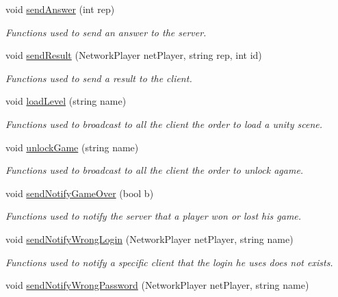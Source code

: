 \begin{DoxyCompactItemize}
void \hyperlink{class_c3_p_o_network_manager_a63c323fb07667c3216f0aa11d4672b25}{send\-Answer} (int rep)
\begin{DoxyCompactList}\small\item\em Functions used to send an answer to the server.\end{DoxyCompactList}\item 
void \hyperlink{class_c3_p_o_network_manager_af5500ddb7ecaba2c27c1cca8c2ff1f20}{send\-Result} (Network\-Player net\-Player, string rep, int id)
\begin{DoxyCompactList}\small\item\em Functions used to send a result to the client.\end{DoxyCompactList}\item 
void \hyperlink{class_c3_p_o_network_manager_af2281ca9381f84544434ba6e0d7295a4}{load\-Level} (string name)
\begin{DoxyCompactList}\small\item\em Functions used to broadcast to all the client the order to load a unity scene.\end{DoxyCompactList}\item 
void \hyperlink{class_c3_p_o_network_manager_a69918ea3508ed121916882d4c29343e9}{unlock\-Game} (string name)
\begin{DoxyCompactList}\small\item\em Functions used to broadcast to all the client the order to unlock agame.\end{DoxyCompactList}\item 
void \hyperlink{class_c3_p_o_network_manager_ab455f5c674444cb5a29daf5a7a4b4529}{send\-Notify\-Game\-Over} (bool b)
\begin{DoxyCompactList}\small\item\em Functions used to notify the server that a player won or lost his game.\end{DoxyCompactList}\item 
void \hyperlink{class_c3_p_o_network_manager_af54380461ce5e59d88494a78e2158524}{send\-Notify\-Wrong\-Login} (Network\-Player net\-Player, string name)
\begin{DoxyCompactList}\small\item\em Functions used to notify a specific client that the login he uses does not exists.\end{DoxyCompactList}\item 
void \hyperlink{class_c3_p_o_network_manager_ac42bd12dd8b220def2264f0812c8059a}{send\-Notify\-Wrong\-Password} (Network\-Player net\-Player, string name)

\end{DoxyCompactItemize}

